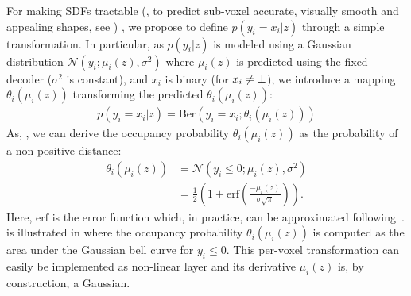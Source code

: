 For making SDFs tractable (\ie, to predict sub-voxel accurate, visually smooth and appealing shapes, see ) , we propose to define $p(y_i = x_i | z)$ through a simple transformation. In particular, as $p(y_i | z)$ is modeled using a Gaussian distribution $\mathcal{N}(y_i ; \mu_i(z), \sigma^2)$ where $\mu_i(z)$ is predicted using the fixed decoder ($\sigma^2$ is constant), and $x_i$ is binary (for $x_i \neq \bot$), we introduce a mapping $\theta_i(\mu_i(z))$ transforming the predicted  $\theta_i(\mu_i(z))$:
%
\begin{align}
p(y_i = x_i | z) = \text{Ber}(y_i = x_i; \theta_i(\mu_i(z)))
\end{align}
%
As, , we can derive the occupancy probability $\theta_i(\mu_i(z))$ as the probability of a non-positive distance:
%
\begin{align}
\theta_i(\mu_i(z)) &= \mathcal{N}(y_i \leq 0; \mu_i(z), \sigma^2)\\[3px]
&= \frac{1}{2} \left(1 + \text{erf}\left(\frac{- \mu_i(z)}{\sigma \sqrt{\pi}}\right)\right).\label{eq:sdf}
\end{align}
%
Here, $\text{erf}$ is the error function which, in practice, can be approximated following~\citep{Abramowitz1974}.  is illustrated in  where the occupancy probability $\theta_i(\mu_i(z))$ is computed as the area under the Gaussian bell curve for $y_i \leq 0$. This per-voxel transformation can easily be implemented as non-linear layer and its derivative \wrt $\mu_i(z)$
is, by construction, a Gaussian.  

